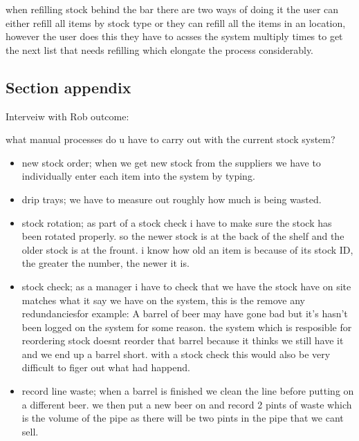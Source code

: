 when refilling stock behind the bar there are two ways of doing it the user can either refill all items by stock type or they can refill all the items in an location, however the user does this they have to acsses the system multiply times to get the next list that needs refilling which elongate the process considerably.



\subsection{Section appendix}

Interveiw with Rob outcome:

what manual processes do u have to carry out with the current stock system?
\begin{itemize}
    \item new stock order; when we get new stock from the suppliers we have to individually enter each item into the system by typing.
    \item drip trays; we have to measure out roughly how much is being wasted.
	\item stock rotation; as part of a stock check i have to make sure the stock has been rotated properly. so the newer stock is at the back of the shelf and the older stock is at the frount. i know how old an item is because of its stock ID, the greater the number, the newer it is.
	\item stock check; as a manager i have to check that we have the stock have on site matches what it say we have on the system, this is the remove any redundanciesfor example: A barrel of beer may have gone bad but it's hasn't been logged on the system for some reason. the system which is resposible for reordering stock doesnt reorder that barrel because it thinks we still have it and we end up a barrel short. with a stock check this would also be very difficult to figer out what had happend.
	\item record line waste; when a barrel is finished we clean the line before putting on a different beer. we then put a new beer on and record 2 pints of waste which is the volume of the pipe as there will be two pints in the pipe that we cant sell.
\end{itemize}

